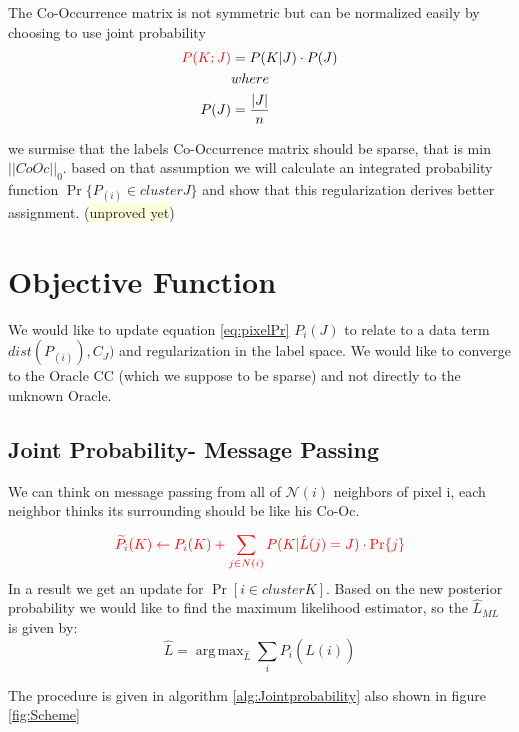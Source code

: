 \documentclass{article}
\DeclareMathOperator*{\argmax}{arg\,max}
\begin{document}
The Co-Occurrence matrix is not symmetric but can be normalized easily by choosing to use joint probability 
\begin{align}
\color{red}
P(K;J)&=P(K|J)\cdot P(J) \label{eq:jointprob}\\
&where\nonumber\\
P(J)&=\dfrac{\vert J\vert}{n} \nonumber
\end{align}


we surmise that the labels Co-Occurrence matrix should be sparse, that is min $||CoOc||_0$. based on that assumption we will calculate an integrated probability function $\Pr \{P_{(i)}\in cluster J\}$ and show that this regularization derives better assignment. (\colorbox{lightyellow}{unproved yet})


\section{Objective Function}
We would like to update equation \eqref{eq:pixelPr} $ P_{i}(J) $ to relate to a data term $ dist(P_{(i)} ),C_J) $ and regularization in the label space.
We would like to converge to the Oracle CC (which we suppose to be sparse) and not directly to the unknown Oracle.

\subsection{Joint Probability- Message Passing}
We can think on message passing from all of $\mathcal{N}(i)$ neighbors of pixel i, each neighbor thinks its surrounding should be like his Co-Oc.
\begin{equation}
\color{red}
\widetilde{P}_i(K) \leftarrow P_i(K) + \sum_{j\in N(i)}^{} P(K|\hat{L}(j)=J)\cdot \Pr\{j\}
\end{equation}
In a result we get an update for $ \Pr [i \in cluster K] $. Based on the new posterior probability we would like to find the maximum likelihood estimator, so the $ \hat{L}_{ML} $ is given by:
$$ \hat{L}=\argmax _{\hat{L}} \sum_{i}^{}P_i(\hat{L}(i)) $$

The procedure is given in algorithm \eqref{alg:Jointprobability} also shown in figure \ref{fig:Scheme}
\newpage
\end{document}
